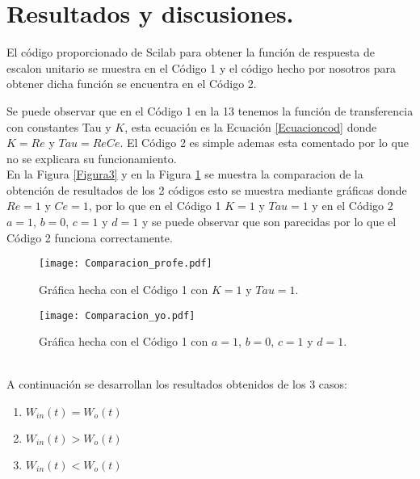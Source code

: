 \documentclass[12pt,a4paper]{article}
\begin{document}
\section{Resultados y discusiones.}
El código proporcionado de Scilab para obtener la función de respuesta de escalon unitario se muestra en el Código 1 y el código hecho por nosotros para obtener dicha función se encuentra en el Código 2.
\begin{center}

\end{center}
\begin{center}

\end{center}
Se puede observar que en el Código 1 en la 13 tenemos la función de transferencia con constantes Tau y $K$, esta ecuación es la Ecuación \ref{Ecuacioncod} donde $K = Re$ y $Tau = ReCe$. El Código 2 es simple ademas esta comentado por lo que no se explicara su funcionamiento.\\[12pt]
En la Figura \ref{Figura3} y en la Figura \ref{Figura4} se muestra la comparacion de la obtención de resultados de los 2 códigos esto se muestra mediante gráficas donde $Re = 1$ y $Ce=1$, por lo que en el Código 1 $K = 1$ y $Tau = 1$ y en el Código 2 $a = 1$, $b = 0$, $c = 1$ y $d = 1$ y se puede observar que son parecidas por lo que el Código 2 funciona correctamente.
\begin{figure}[h!]
\begin{minipage}{8cm} 
\centering
\texttt{[image: Comparacion\_profe.pdf]}
\caption{Gráfica hecha con el Código 1 con $K = 1$ y $Tau = 1$.}
\label{Figura3}
\end{minipage}
\hspace{0.5cm}
\begin{minipage}{8cm}
\centering
\texttt{[image: Comparacion\_yo.pdf]}
\caption{Gráfica hecha con el Código 1 con $a = 1$, $b = 0$, $c = 1$ y $d = 1$.}
\label{Figura4}
\end{minipage}
\end{figure}\\
A continuación se desarrollan los resultados obtenidos de los 3 casos:
\begin{enumerate}[$\cdot$]
\item $W_{in}(t) = W_{o}(t)$
\item $W_{in}(t) > W_{o}(t)$
\item $W_{in}(t) < W_{o}(t)$
\end{enumerate}
\end{document}
